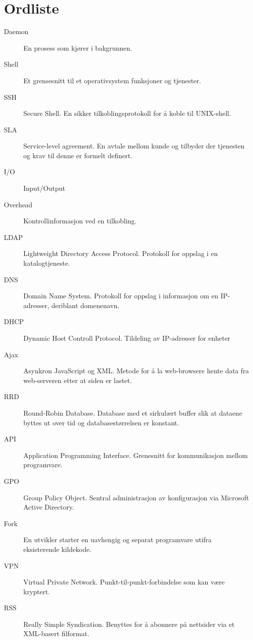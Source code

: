 \chapter*{Ordliste}
\begin{description}
	\item[Daemon] En prosess som kjører i bakgrunnen.
	\item[Shell] Et grensesnitt til et operativsystem funksjoner og tjenester.
	\item[SSH] Secure Shell. En sikker tilkoblingsprotokoll for å koble til UNIX-shell.
	\item[SLA] Service-level agreement. En avtale mellom kunde og tilbyder der tjenesten og krav til denne er formelt definert.
	\item[I/O] Input/Output
	\item[Overhead] Kontrollinformasjon ved en tilkobling.
	\item[LDAP] Lightweight Directory Access Protocol. Protokoll for oppslag i en katalogtjeneste.
	\item[DNS] Domain Name System. Protokoll for oppslag i informasjon om en IP-adresser, deriblant domenenavn.
	\item[DHCP] Dynamic Host Controll Protocol. Tildeling av IP-adresser for enheter
	\item[Ajax] Asynkron JavaScript og XML. Metode for å la web-browsere hente data fra web-serveren etter at siden er lastet.
	\item[RRD] Round-Robin Database. Database med et sirkulært buffer slik at dataene byttes ut over tid og databasestørrelsen er konstant.
	\item[API] Application Programming Interface. Grenesnitt for kommunikasjon mellom programvare.
	\item[GPO] Group Policy Object. Sentral administrasjon av konfigurasjon via Microsoft Active Directory.
	\item[Fork] En utvikler starter en uavhengig og separat programvare utifra eksisterende kildekode.
	\item[VPN] Virtual Private Network. Punkt-til-punkt-forbindelse som kan være kryptert.
	\item[RSS] Really Simple Syndication. Benyttes for å abonnere på nettsider via et XML-basert filformat.
\end{description}
